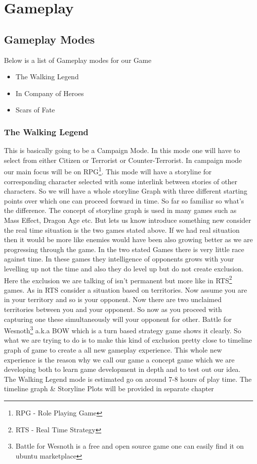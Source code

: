 \chapter{Gameplay}
\section{Gameplay Modes}
Below is a list of Gameplay modes for our Game
\begin{itemize}
\item The Walking Legend                    %
\item In Company of Heroes                  %
\item Scars of Fate                         %
\end{itemize}
\subsection{The Walking Legend}
This is basically going to be a Campaign Mode. In this mode one will have to select from either Citizen or Terrorist or Counter-Terrorist. In campaign mode our main focus will be on RPG\footnote{RPG - Role Playing Game}. This mode will have a storyline for corresponding character selected with some interlink between stories of other characters. So we will have a whole storyline Graph with three different starting points over which one can proceed forward in time. So far so familiar so what's the difference. The concept of storyline graph is used in many games such as Mass Effect, Dragon Age etc. But lets us know introduce something new consider the real time situation is the two games stated above. If we had real situation then it would be more like enemies would have been also growing better as we are progressing through the game. In the two stated Games there is very little race against time. In these games they intelligence of opponents grows with your levelling up not the time and also they do level up but do not create exclusion. Here the exclusion we are talking of isn't permanent but more like in RTS\footnote{RTS - Real Time Strategy} games. As in RTS consider a situation based on territories. Now assume you are in your territory and so is your opponent. Now there are two unclaimed territories between you and your opponent. So now as you proceed with capturing one these simultaneously will your opponent for other. Battle for Wesnoth\footnote{Battle for Wesnoth is a free and open source game one can easily find it on ubuntu marketplace} a.k.a BOW which is a turn based strategy game shows it clearly. So what we are trying to do is to make this kind of exclusion pretty close to timeline graph of game to create a all new gameplay experience. This whole new experience is the reason why we call our game a concept game which we are developing both to learn game development in depth and to test out our idea. The Walking Legend mode is estimated go on around 7-8 hours of play time. The timeline graph \& Storyline Plots will be provided in separate chapter
